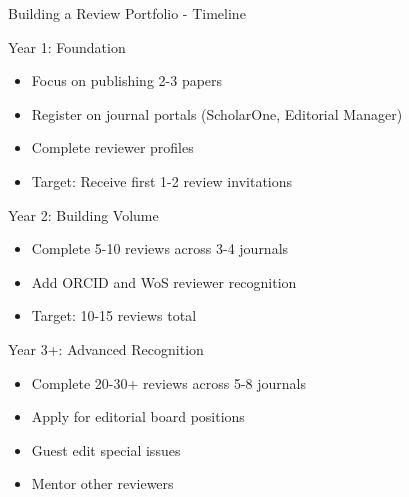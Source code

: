 \documentclass[11pt]{beamer}
\begin{document}
				\begin{frame}{Building a Review Portfolio - Timeline}
					\scriptsize
					\begin{block}{Year 1: Foundation}
						\begin{itemize}
							\item Focus on publishing 2-3 papers
							\item Register on journal portals (ScholarOne, Editorial Manager)
							\item Complete reviewer profiles
							\item Target: Receive first 1-2 review invitations
						\end{itemize}
					\end{block}
					\begin{block}{Year 2: Building Volume}
						\begin{itemize}
							\item Complete 5-10 reviews across 3-4 journals
							\item Add ORCID and WoS reviewer recognition
							\item Target: 10-15 reviews total
						\end{itemize}
					\end{block}
					\begin{block}{Year 3+: Advanced Recognition}
						\begin{itemize}
							\item Complete 20-30+ reviews across 5-8 journals
							\item Apply for editorial board positions
							\item Guest edit special issues
							\item Mentor other reviewers
						\end{itemize}
					\end{block}
				\end{frame}
				
\end{document}
